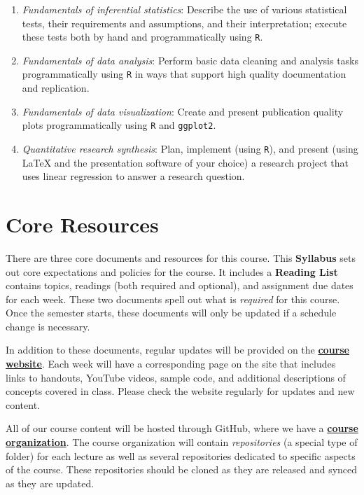 \documentclass[]{book}
\theoremstyle{definition}
\theoremstyle{definition}
\theoremstyle{definition}
\theoremstyle{remark}
\begin{document}
\begin{enumerate}
\def\labelenumi{\arabic{enumi}.}
\item
  \emph{Fundamentals of inferential statistics}: Describe the use of
  various statistical tests, their requirements and assumptions, and
  their interpretation; execute these tests both by hand and
  programmatically using \texttt{R}.
\item
  \emph{Fundamentals of data analysis}: Perform basic data cleaning and
  analysis tasks programmatically using \texttt{R} in ways that support
  high quality documentation and replication.
\item
  \emph{Fundamentals of data visualization}: Create and present
  publication quality plots programmatically using \texttt{R} and
  \texttt{ggplot2}.
\item
  \emph{Quantitative research synthesis}: Plan, implement (using
  \texttt{R}), and present (using LaTeX and the presentation software of
  your choice) a research project that uses linear regression to answer
  a research question.
\end{enumerate}

\section{Core Resources}\label{core-resources}

There are three core documents and resources for this course. This
\textbf{Syllabus} sets out core expectations and policies for the
course. It includes a \textbf{Reading List} contains topics, readings
(both required and optional), and assignment due dates for each week.
These two documents spell out what is \emph{required} for this course.
Once the semester starts, these documents will only be updated if a
schedule change is necessary.

In addition to these documents, regular updates will be provided on the
\href{https://slu-soc5050.github.io}{\textbf{course website}}. Each week
will have a corresponding page on the site that includes links to
handouts, YouTube videos, sample code, and additional descriptions of
concepts covered in class. Please check the website regularly for
updates and new content.

All of our course content will be hosted through GitHub, where we have a
\href{https://github.com/slu-soc5050}{\textbf{course organization}}. The
course organization will contain \emph{repositories} (a special type of
folder) for each lecture as well as several repositories dedicated to
specific aspects of the course. These repositories should be cloned as
they are released and synced as they are updated.


\end{document}
